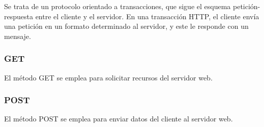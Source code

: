Se trata de un protocolo orientado a transacciones, que sigue el esquema petición-respuesta entre el cliente y el servidor. En una transacción HTTP, el cliente envía una petición en un formato determinado al servidor, y este le responde con un mensaje.


\subsubsection{GET}
\cite{getypost} El método GET se emplea para solicitar recursos del servidor web.

\subsubsection{POST}
\cite{getypost} El método POST se emplea para enviar datos del cliente al servidor web.

